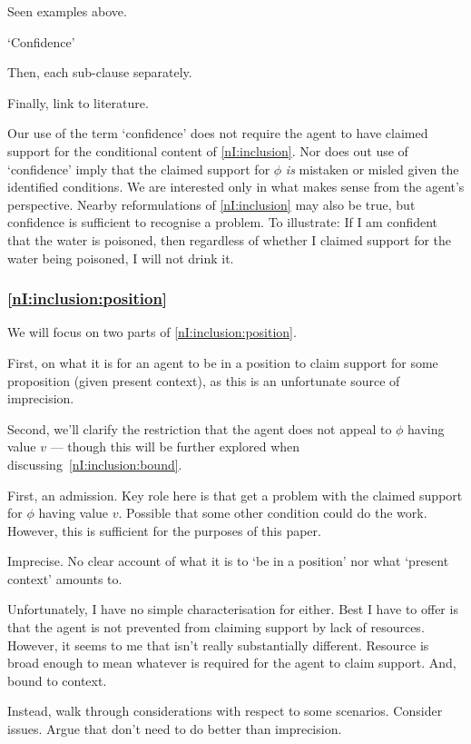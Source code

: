 {
  \color{red}
  Seen examples above.
}

\begin{note}
  `Confidence'

  Then, each sub-clause separately.

  Finally, link to literature.
\end{note}

\begin{note}[`Confidence']
  Our use of the term `confidence' does not require the agent to have claimed support for the conditional content of \ref{nI:inclusion}.
  Nor does out use of `confidence' imply that the claimed support for \(\phi\) \emph{is} mistaken or misled given the identified conditions.
  We are interested only in what makes sense from the agent's perspective.
  Nearby reformulations of \ref{nI:inclusion} may also be true, but confidence is sufficient to recognise a problem.
  To illustrate: If I am confident that the water is poisoned, then regardless of whether I claimed support for the water being poisoned, I will not drink it.
\end{note}

\subsubsection{\ref{nI:inclusion:position}}

\begin{note}
  We will focus on two parts of \ref{nI:inclusion:position}.

  First, on what it is for an agent to be in a position to claim support for some proposition (given present context), as this is an unfortunate source of imprecision.

  Second, we'll clarify the restriction that the agent does not appeal to \(\phi\) having value \(v\) --- though this will be further explored when discussing~\ref{nI:inclusion:bound}.
\end{note}

\begin{note}
  First, an admission.
  Key role here is that get a problem with the claimed support for \(\phi\) having value \(v\).
  Possible that some other condition could do the work.
  However, this is sufficient for the purposes of this paper.
\end{note}

\begin{note}
  Imprecise.
  No clear account of what it is to `be in a position' nor what `present context' amounts to.

  Unfortunately, I have no simple characterisation for either.
  Best I have to offer is that the agent is not prevented from claiming support by lack of resources.
  However, it seems to me that isn't really substantially different.
  Resource is broad enough to mean whatever is required for the agent to claim support.
  And, bound to context.

  Instead, walk through considerations with respect to some scenarios.
  Consider issues.
  Argue that don't need to do better than imprecision.
\end{note}

